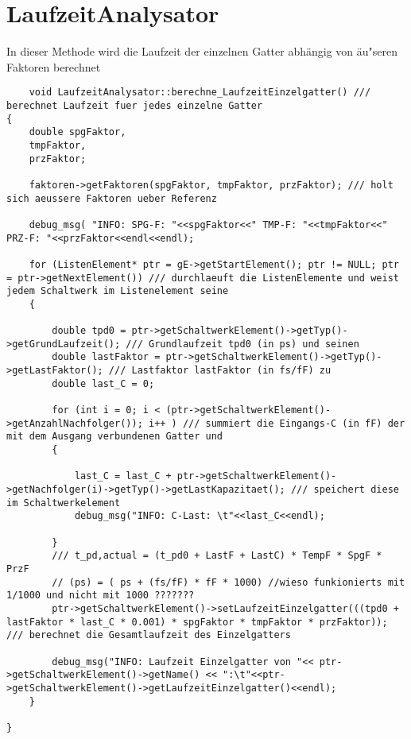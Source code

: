 \documentclass[11pt]{article}
\begin{document}
\section{LaufzeitAnalysator}
In dieser Methode wird die Laufzeit der einzelnen Gatter abhängig von äu"seren Faktoren berechnet
\begin{lstlisting}
	void LaufzeitAnalysator::berechne_LaufzeitEinzelgatter() /// berechnet Laufzeit fuer jedes einzelne Gatter
{
    double spgFaktor,
    tmpFaktor,
    przFaktor;

    faktoren->getFaktoren(spgFaktor, tmpFaktor, przFaktor); /// holt sich aeussere Faktoren ueber Referenz

    debug_msg( "INFO: SPG-F: "<<spgFaktor<<" TMP-F: "<<tmpFaktor<<" PRZ-F: "<<przFaktor<<endl<<endl);

    for (ListenElement* ptr = gE->getStartElement(); ptr != NULL; ptr = ptr->getNextElement()) /// durchlaeuft die ListenElemente und weist jedem Schaltwerk im Listenelement seine
    {

        double tpd0 = ptr->getSchaltwerkElement()->getTyp()->getGrundLaufzeit(); /// Grundlaufzeit tpd0 (in ps) und seinen
        double lastFaktor = ptr->getSchaltwerkElement()->getTyp()->getLastFaktor(); /// Lastfaktor lastFaktor (in fs/fF) zu
        double last_C = 0;

        for (int i = 0; i < (ptr->getSchaltwerkElement()->getAnzahlNachfolger()); i++ ) /// summiert die Eingangs-C (in fF) der mit dem Ausgang verbundenen Gatter und
        {

            last_C = last_C + ptr->getSchaltwerkElement()->getNachfolger(i)->getTyp()->getLastKapazitaet(); /// speichert diese im Schaltwerkelement
            debug_msg("INFO: C-Last: \t"<<last_C<<endl);

        }
        /// t_pd,actual = (t_pd0 + LastF + LastC) * TempF * SpgF * PrzF
        // (ps) = ( ps + (fs/fF) * fF * 1000) //wieso funkionierts mit 1/1000 und nicht mit 1000 ???????
        ptr->getSchaltwerkElement()->setLaufzeitEinzelgatter(((tpd0 + lastFaktor * last_C * 0.001) * spgFaktor * tmpFaktor * przFaktor)); /// berechnet die Gesamtlaufzeit des Einzelgatters

        debug_msg("INFO: Laufzeit Einzelgatter von "<< ptr->getSchaltwerkElement()->getName() << ":\t"<<ptr->getSchaltwerkElement()->getLaufzeitEinzelgatter()<<endl);
    }

}

\end{lstlisting}
\end{document}
